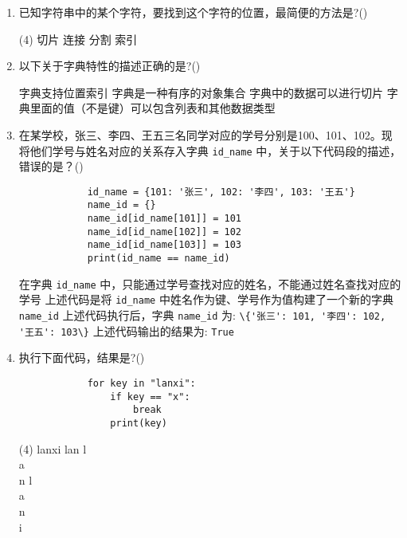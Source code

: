\documentclass[11pt]{ctexart}
\begin{document}
\begin{enumerate}
        \item 已知字符串中的某个字符，要找到这个字符的位置，最简便的方法是?(\qquad)
        \begin{tasks}(4)
            \task 切片
            \task 连接
            \task 分割
            \task 索引
        \end{tasks}

        \item 以下关于字典特性的描述正确的是?(\qquad)
        \begin{tasks}
            \task 字典支持位置索引
            \task 字典是一种有序的对象集合
            \task 字典中的数据可以进行切片
            \task 字典里面的值（不是键）可以包含列表和其他数据类型
        \end{tasks}

        \item 在某学校，张三、李四、王五三名同学对应的学号分别是100、101、102。现将他们学号与姓名对应的关系存入字典 \lstinline{id_name} 中，关于以下代码段的描述，错误的是？(\qquad)
        \begin{lstlisting}
            id_name = {101: '张三', 102: '李四', 103: '王五'}
            name_id = {}
            name_id[id_name[101]] = 101
            name_id[id_name[102]] = 102
            name_id[id_name[103]] = 103
            print(id_name == name_id)
        \end{lstlisting}
        \begin{tasks}
            \task 在字典 \lstinline{id_name} 中，只能通过学号查找对应的姓名，不能通过姓名查找对应的学号
            \task 上述代码是将 \lstinline{id_name} 中姓名作为键、学号作为值构建了一个新的字典 \lstinline{name_id}
            \task 上述代码执行后，字典 \lstinline{name_id} 为: \lstinline!\{'张三': 101, '李四': 102, '王五': 103\}!
            \task 上述代码输出的结果为: \lstinline!True!
        \end{tasks}

        \item 执行下面代码，结果是?(\qquad)
        \begin{lstlisting}
            for key in "lanxi":
                if key == "x":        
                    break    
                print(key)
        \end{lstlisting}
        \begin{tasks}(4)
            \task lanxi
            \task lan
            \task l\\a\\n
            \task l\\a\\n\\i
        \end{tasks}


\end{enumerate}
\end{document}
